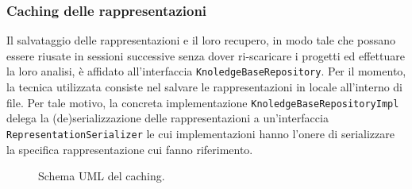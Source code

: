 \subsubsection*{Caching delle rappresentazioni}
Il salvataggio delle rappresentazioni e il loro recupero, in modo tale che possano essere riusate in sessioni successive senza dover ri-scaricare i progetti ed effettuare la loro analisi, è affidato all'interfaccia \texttt{KnoledgeBaseRepository}.
%
Per il momento, la tecnica utilizzata consiste nel salvare le rappresentazioni in locale all'interno di file.
%
Per tale motivo, la concreta implementazione \texttt{KnoledgeBaseRepositoryImpl} delega la (de)serializzazione delle rappresentazioni a un'interfaccia \texttt{RepresentationSerializer} le cui implementazioni hanno l'onere di serializzare la specifica rappresentazione cui fanno riferimento.

\begin{figure}[h!]
    \caption{Schema UML del caching.}
    \label{img:02-caching}
\end{figure}